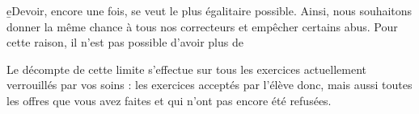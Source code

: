 ﻿\b{eDevoir}, encore une fois, se veut le plus égalitaire possible. Ainsi, nous souhaitons donner la même chance à tous nos correcteurs et empêcher certains abus. Pour cette raison, il n'est pas possible d'avoir plus de %

Le décompte de cette limite s'effectue sur tous les exercices actuellement verrouillés par vos soins : les exercices acceptés par l'élève donc, mais aussi toutes les offres que vous avez faites et qui n'ont pas encore été refusées.